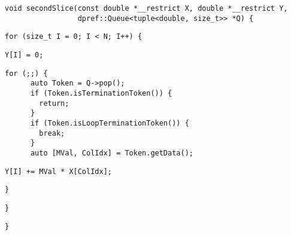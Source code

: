 \begin{lstlisting}[style=cppcode]
void secondSlice(const double *__restrict X, double *__restrict Y,
                 dpref::Queue<tuple<double, size_t>> *Q) {
\end{lstlisting}\vspace{-\baselineskip}

\begin{lstlisting}[style=cppcode, backgroundcolor=\color{yellow!15}, firstnumber=last]
  for (size_t I = 0; I < N; I++) {
\end{lstlisting}\vspace{-\baselineskip}

\begin{lstlisting}[style=cppcode, backgroundcolor=\color{red!15}, firstnumber=last]
    Y[I] = 0;
\end{lstlisting}\vspace{-\baselineskip}

\begin{lstlisting}[style=cppcode, firstnumber=last]
    for (;;) {
      auto Token = Q->pop();
      if (Token.isTerminationToken()) {
        return;
      }
      if (Token.isLoopTerminationToken()) {
        break;
      }
      auto [MVal, ColIdx] = Token.getData();
\end{lstlisting}\vspace{-\baselineskip}

\begin{lstlisting}[style=cppcode, backgroundcolor=\color{red!15}, firstnumber=last]
      Y[I] += MVal * X[ColIdx];
\end{lstlisting}\vspace{-\baselineskip}

\begin{lstlisting}[style=cppcode, firstnumber=last]
    }
\end{lstlisting}\vspace{-\baselineskip}

\begin{lstlisting}[style=cppcode, backgroundcolor=\color{yellow!15}, firstnumber=last]
  }
\end{lstlisting}\vspace{-\baselineskip}

\begin{lstlisting}[style=cppcode, firstnumber=last]
}
\end{lstlisting}\vspace{-\baselineskip}
